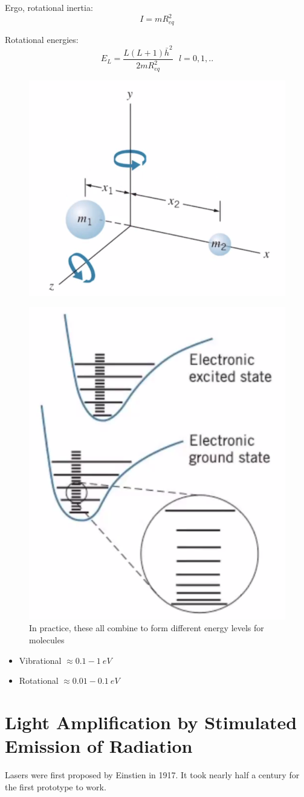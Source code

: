 \documentclass[class=article,crop=false]{standalone}
\begin{document}
Ergo, rotational inertia:
$$ I = mR_{eq}^2 $$

Rotational energies:
$$ E_L = \frac{L(L+1)\bar{h}^2}{2mR_{eq}^2}\ \ \ l=0,1,.. $$


\begin{figure}[h!]
	\centering
	\includegraphics[width=.4\linewidth]{./Images/rotational.png}
	\caption{}
\end{figure}


\begin{figure}[h!]
	\centering
	\includegraphics[width=.4\linewidth]{./Images/levels.png}
	\caption{In practice, these all combine to form different energy levels for molecules}
\end{figure}

\begin{result}
	\begin{itemize}
		\item Vibrational $\approx 0.1-1\ eV$
		\item Rotational $\approx 0.01-0.1\ eV$
	\end{itemize}
\end{result}

\newpage
\section{Light Amplification by Stimulated Emission of Radiation}
Lasers were first proposed by Einstien in 1917. It took nearly half a century for the first prototype to work. \\
\end{document}
